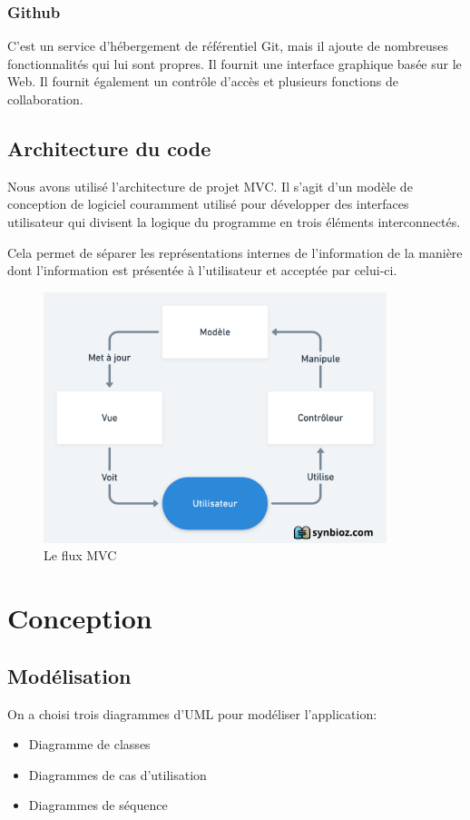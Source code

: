 \documentclass[french, a4paper, french]{report}
\begin{document}
		\subsection*{Github} C'est un service d'hébergement de référentiel Git, mais il ajoute de nombreuses fonctionnalités qui lui sont propres. Il fournit une interface graphique basée sur le Web. Il fournit également un contrôle d'accès et plusieurs fonctions de collaboration.
	\section{Architecture du code} %
		Nous avons utilisé l'architecture de projet MVC. Il s'agit d'un modèle de conception de logiciel couramment utilisé pour développer des interfaces utilisateur qui divisent la logique du programme en trois éléments interconnectés.

Cela permet de séparer les représentations internes de l'information de la manière dont l'information est présentée à l'utilisateur et acceptée par celui-ci.
\begin{figure}[!h]
  \center
  \includegraphics[width=10cm]{mvc.png}
  \caption{Le flux MVC}
  \label{fig:fluxmvc}
\end{figure}

\newpage
\chapter{Conception}
	\section{Modélisation} On a choisi trois diagrammes d’UML pour modéliser l'application:
		\begin{itemize}
			\item Diagramme de classes
			\item Diagrammes de cas d’utilisation
			\item Diagrammes de séquence
		\end{itemize}
		
\end{document}
